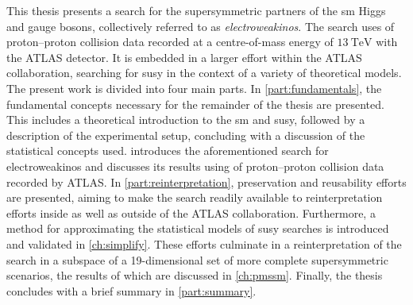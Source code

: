 This thesis presents a search for the supersymmetric partners of the \gls{sm} Higgs and gauge bosons, collectively referred to as \textit{electroweakinos}. The search uses \onethirtynineifb of proton--proton collision data recorded at a centre-of-mass energy of $\SI{13}{\TeV}$ with the ATLAS detector.
It is embedded in a larger effort within the ATLAS collaboration, searching for \gls{susy} in the context of a variety of theoretical models.
The present work is divided into four main parts.
In \cref{part:fundamentals}, the fundamental concepts necessary for the remainder of the thesis are presented.
This includes a theoretical introduction to the \gls{sm} and \gls{susy}, followed by a description of the experimental setup, concluding with a discussion of the statistical concepts used.
 introduces the aforementioned search for electroweakinos and discusses its results using \onethirtynineifb of proton--proton collision data recorded by ATLAS.
In \cref{part:reinterpretation}, preservation and reusability efforts are presented, aiming to make the search readily available to reinterpretation efforts inside as well as outside of the ATLAS collaboration.
Furthermore, a method for approximating the statistical models of \gls{susy} searches is introduced and validated in \cref{ch:simplify}. These efforts culminate in a reinterpretation of the search in a subspace of a 19-dimensional set of more complete supersymmetric scenarios, the results of which are discussed in \cref{ch:pmssm}.
Finally, the thesis concludes with a brief summary in \cref{part:summary}.

